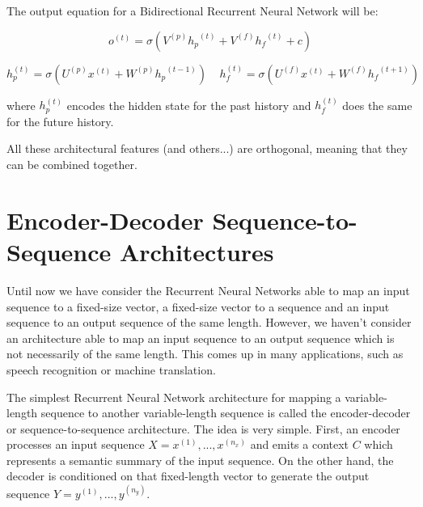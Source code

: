 \noindent The output equation for a Bidirectional Recurrent Neural Network  will be:

$$ o^{(t)} = \sigma \left(V^{(p)} {h_p}^{(t)} + V^{(f)} {h_f}^{(t)} + c \right) $$

$$ h_p^{(t)} = \sigma \left( U^{(p)} x^{(t)} + W^{(p)} {h_p}^{(t-1)}  \right)  ~~~~~ h_f^{(t)} = \sigma \left( U^{(f)} x^{(t)} + W^{(f)} {h_f}^{(t+1)}  \right) $$

\noindent where $h_p^{(t)}$ encodes the hidden state for the past history and $h_f^{(t)}$ does the same for the future history.

\noindent All these architectural features (and others...) are orthogonal, meaning that they can be combined together.

\newpage
\section{Encoder-Decoder Sequence-to-Sequence Architectures}

Until now we have consider the Recurrent Neural Networks able to map an input sequence to a ﬁxed-size vector, a ﬁxed-size vector to a sequence and an input sequence to an output sequence of the same length. However, we haven't consider an architecture able to map an input sequence to an output sequence which is not necessarily of the same length. This comes up in many applications, such as speech recognition or machine translation.

The simplest Recurrent Neural Network architecture for mapping a variable-length sequence to another variable-length sequence is called the encoder-decoder or sequence-to-sequence architecture. The idea is very simple. First, an encoder processes an input sequence $X = x^{(1)}, ..., x^{(n_x)}$ and emits a context $C$ which represents a semantic summary of the input sequence. On the other hand, the decoder is conditioned on that ﬁxed-length vector to generate the output sequence $Y = y^{(1)}, ..., y^{(n_y)}$.



